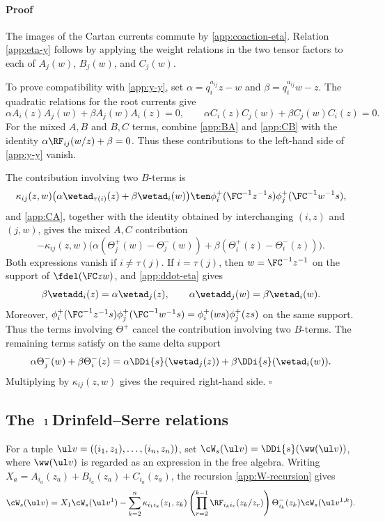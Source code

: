 \documentclass[reqno]{amsart}
\numberwithin{equation}{section}
\newenvironment{pf}{\medskip\paragraph{{\sc Proof}}}{\hfill$\square$\par\medskip}
\begin{document}
\begin{pf}
	The images of the Cartan currents commute by \eqref{app:coaction-eta}. Relation \eqref{app:eta-y} follows by applying the weight relations in the two tensor factors to each of $A_j(w)$, $B_j(w)$, and $C_j(w)$.
	
	To prove compatibility with \eqref{app:y-y}, set $\alpha=q_i^{a_{ij}}z-w$ and $\beta=q_i^{a_{ij}}w-z$.
	The quadratic relations for the root currents give
	\[
	\alpha A_i(z)A_j(w)+\beta A_j(w)A_i(z)=0,
	\qquad
	\alpha C_i(z)C_j(w)+\beta C_j(w)C_i(z)=0.
	\]
	For the mixed $A,B$ and $B,C$ terms, combine \eqref{app:BA} and
	\eqref{app:CB} with the identity $\alpha\RF_{ij}(w/z)+\beta=0$.
	Thus these contributions to the left-hand side of \eqref{app:y-y} vanish.
	
	The contribution involving two $B$-terms is
	\[
	\kappa_{ij}(z,w)
	\bigl(\alpha\wetad_{\tau(i)}(z)+\beta\wetad_i(w)\bigr)
	\ten \phi_i^+({\FC^{-1}z^{-1}} s)\phi_j^+({\FC^{-1}w^{-1}} s),
	\]
	and \eqref{app:CA}, together with the identity obtained by interchanging $(i,z)$ and $(j,w)$, gives the mixed $A,C$ contribution
	\[
	-\kappa_{ij}(z,w)
	\bigl(\alpha(\Theta_j^+(w)-\Theta_j^-(w))
	+\beta(\Theta_i^+(z)-\Theta_i^-(z))\bigr).
	\]
	Both expressions vanish if $i\ne\tau(j)$. If $i=\tau(j)$, then $w={\FC^{-1}z^{-1}}$ on the support of $\fdel(\FC zw)$, and \eqref{app:ddot-eta} gives
	\[
	\beta\wetadd_i(z)=\alpha\wetad_j(z),\qquad
	\alpha\wetadd_j(w)=\beta\wetad_i(w).
	\]
	Moreover, $\phi_i^+({\FC^{-1}z^{-1}} s)\phi_j^+({\FC^{-1}w^{-1}} s)=\phi_i^+(ws)\phi_j^+(zs)$ on the same support. Thus the terms involving $\Theta^+$ cancel the contribution involving two $B$-terms. The remaining terms satisfy on the same delta support
	\[
	\alpha\Theta_j^-(w)+\beta\Theta_i^-(z)
	=\alpha\DDi{s}(\wetad_j(z))+\beta\DDi{s}(\wetad_i(w)).
	\]
	Multiplying by $\kappa_{ij}(z,w)$ gives the required right-hand side.
\end{pf}

\subsection{The $\imath$Drinfeld--Serre relations}
For a tuple $\ul v=((i_1,z_1),\ldots,(i_n,z_n))$, set $\cW_s(\ul v)=\DDi{s}(\ww(\ul v))$, where $\ww(\ul v)$ is regarded as an expression in the free algebra. Writing $X_a=A_{i_a}(z_a)+B_{i_a}(z_a)+C_{i_a}(z_a)$, the recursion \eqref{app:W-recursion} gives
\begin{equation}
	\cW_s(\ul v)=X_1\cW_s(\ul v^1)-\sum_{k=2}^n
	\kappa_{i_1i_k}(z_1,z_k)\left(\prod_{r=2}^{k-1}\RF_{i_k i_r}(z_k/z_r)\right)
	\Theta^-_{i_k}(z_k)\cW_s(\ul v^{1,k}).
	\label{app:Ws-recursion}
\end{equation}
\end{document}

